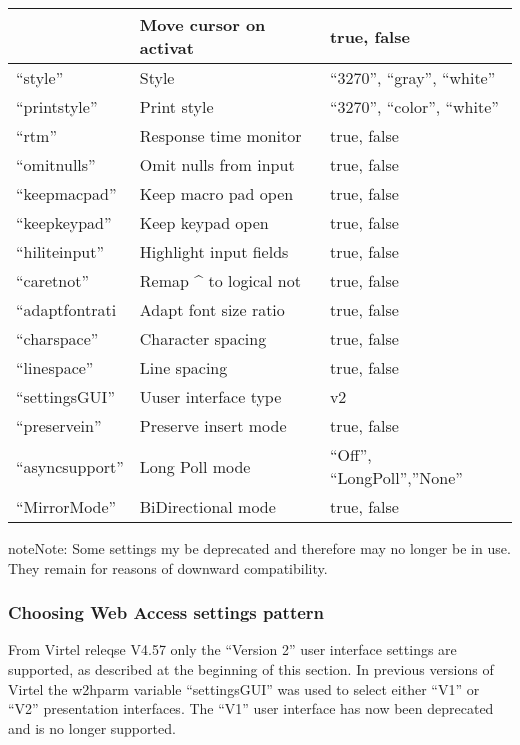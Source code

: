 \documentclass[letterpaper,10pt,english]{sphinxmanual}
\begin{document}
\begin{savenotes}
\begin{longtable}{|l|l|l|}
&
Move cursor on activat
&
true, false
\\
\hline
“style”
&
Style
&
“3270”, “gray”, “white”
\\
\hline
“printstyle”
&
Print style
&
“3270”, “color”, “white”
\\
\hline
“rtm”
&
Response time monitor
&
true, false
\\
\hline
“omitnulls”
&
Omit nulls from input
&
true, false
\\
\hline
“keepmacpad”
&
Keep macro pad open
&
true, false
\\
\hline
“keepkeypad”
&
Keep keypad open
&
true, false
\\
\hline
“hiliteinput”
&
Highlight input fields
&
true, false
\\
\hline
“caretnot”
&
Remap \textasciicircum{} to logical not
&
true, false
\\
\hline
“adaptfontrati
&
Adapt font size ratio
&
true, false
\\
\hline
“charspace”
&
Character spacing
&
true, false
\\
\hline
“linespace”
&
Line spacing
&
true, false
\\
\hline
“settingsGUI”
&
Uuser interface type
&
v2
\\
\hline
“preservein”
&
Preserve insert mode
&
true, false
\\
\hline
“asyncsupport”
&
Long Poll mode
&
“Off”, “LongPoll”,”None”
\\
\hline
“MirrorMode”
&
BiDirectional mode
&
true, false
\\
\hline
\end{longtable}\sphinxatlongtableend\end{savenotes}


\begin{sphinxadmonition}{note}{Note:}
Some settings my be deprecated and therefore may no longer be in use. They remain for reasons of downward compatibility.
\end{sphinxadmonition}


\subsubsection{Choosing Web Access settings pattern}
\label{\detokenize{User_Guide:choosing-web-access-settings-pattern}}
From Virtel releqse V4.57 only the “Version 2” user interface settings are supported, as described at the beginning of this section. In previous versions of Virtel the w2hparm variable “settingsGUI” was used to select either “V1” or “V2” presentation interfaces. The “V1” user interface has now been deprecated and is no longer supported.
\end{document}
